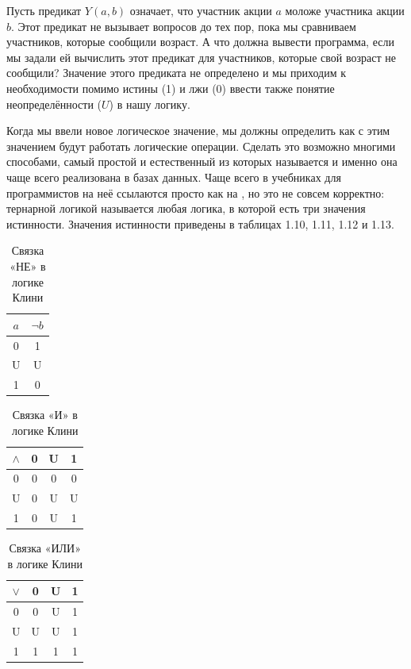 Пусть предикат $Y(a, b)$ означает, что участник акции $a$ моложе участника акции $b$. Этот предикат не вызывает вопросов до тех пор, пока мы сравниваем участников, которые сообщили возраст. А что должна вывести программа, если мы задали ей вычислить этот предикат для участников, которые свой возраст не сообщили? Значение этого предиката не определено и мы приходим к необходимости помимо истины (1) и лжи (0) ввести также понятие неопределённости ($U$) в нашу логику.

Когда мы ввели новое логическое значение, мы должны определить как с этим значением будут работать логические операции. Сделать это возможно многими способами, самый простой и естественный из которых называется  и именно она чаще всего реализована в базах данных. Чаще всего в учебниках для программистов на неё ссылаются просто как на , но это не совсем корректно: тернарной логикой называется любая логика, в которой есть три значения истинности. Значения истинности приведены в таблицах 1.10, 1.11, 1.12 и 1.13.

\begin{table}[h]
\centering
\begin{tabular}{c | c}
$a$ & $\neg b$ \\
\hline
0 & 1 \\
U & U\\
1 & 0
\end{tabular}
\caption{Связка «НЕ» в логике Клини}\label{table:kleene-not}
\end{table}

\begin{table}[h]
\centering
\begin{tabular}{c | c c c}
$\land$ & 0 &U &1 \\
\hline
0 & 0 & 0 & 0 \\
U & 0 & U & U\\
1 & 0 & U & 1
\end{tabular}
\caption{Связка «И» в логике Клини}\label{table:kleene-and}
\end{table}

\begin{table}[h]
\centering
\begin{tabular}{c | c c c}
$\lor$ & 0 &U &1 \\
\hline
0 & 0 & U & 1 \\
U & U & U & 1\\
1 & 1 & 1 & 1
\end{tabular}
\caption{Связка «ИЛИ» в логике Клини}\label{table:kleene-or}
\end{table}

